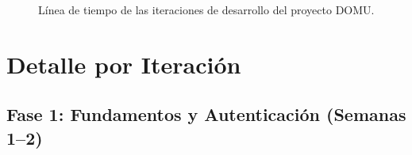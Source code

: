 %
%
%
%
\begin{figure}[H]
  \centering
  \caption{Línea de tiempo de las iteraciones de desarrollo del proyecto DOMU.}
  \label{fig:timeline-iteraciones}
\end{figure}

\section{Detalle por Iteración}

\subsection{Fase 1: Fundamentos y Autenticación (Semanas 1--2)}

